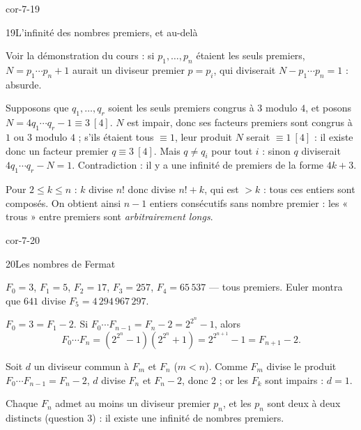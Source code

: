 \begin{blocLivre}{cor-7-19}
\begin{corrige}{19}{L'infinité des nombres premiers, et au-delà}
\begin{questions}
  \item Voir la démonstration du cours : si $p_1,\dots,p_n$ étaient les
    seuls premiers, $N=p_1\cdots p_n+1$ aurait un diviseur premier $p=p_i$,
    qui diviserait $N-p_1\cdots p_n=1$ : absurde.
  \item Supposons que $q_1,\dots,q_r$ soient les seuls premiers congrus à
    $3$ modulo $4$, et posons $N=4q_1\cdots q_r-1\equiv3\ [4]$. $N$ est
    impair, donc ses facteurs premiers sont congrus à $1$ ou $3$ modulo
    $4$ ; s'ils étaient tous $\equiv1$, leur produit $N$ serait
    $\equiv1\ [4]$ : il existe donc un facteur premier $q\equiv3\ [4]$.
    Mais $q\neq q_i$ pour tout $i$ : sinon $q$ diviserait
    $4q_1\cdots q_r-N=1$. Contradiction : il y a une infinité de premiers
    de la forme $4k+3$.
  \item Pour $2\leq k\leq n$ : $k$ divise $n!$ donc divise $n!+k$, qui est
    $>k$ : tous ces entiers sont composés. On obtient ainsi $n-1$ entiers
    consécutifs sans nombre premier : les « trous » entre premiers sont
    \emph{arbitrairement longs}.
\end{questions}
\end{corrige}
\end{blocLivre}

\begin{blocLivre}{cor-7-20}
\begin{corrige}{20}{Les nombres de Fermat}
\begin{questions}
  \item $F_0=3$, $F_1=5$, $F_2=17$, $F_3=257$, $F_4=65\,537$ — tous
    premiers. Euler montra que $641$ divise
    $F_5=4\,294\,967\,297$.
  \item {} $F_0=3=F_1-2$.
     Si $F_0\cdots F_{n-1}=F_n-2=2^{2^{n}}-1$, alors
    \[
      F_0\cdots F_n=(2^{2^{n}}-1)(2^{2^{n}}+1)=2^{2^{n+1}}-1=F_{n+1}-2.
    \]
  \item Soit $d$ un diviseur commun à $F_m$ et $F_n$ ($m<n$). Comme $F_m$
    divise le produit $F_0\cdots F_{n-1}=F_n-2$, $d$ divise $F_n$ et
    $F_n-2$, donc $2$ ; or les $F_k$ sont impairs : $d=1$.
  \item Chaque $F_n$ admet au moins un diviseur premier $p_n$, et les
    $p_n$ sont deux à deux distincts (question 3) : il existe une infinité
    de nombres premiers.
\end{questions}
\end{corrige}
\end{blocLivre}


